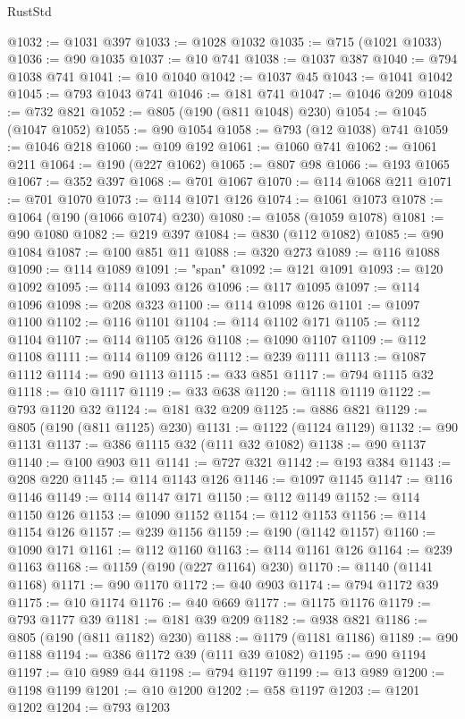 \begin{lexlean}{RustStd}
\begin{coremodule}
@1032 := @1031 @397
@1033 := @1028 @1032
@1035 := @715 (@1021 @1033)
@1036 := @90 @1035
@1037 := @10 @741
@1038 := @1037 @387
@1040 := @794 @1038 @741
@1041 := @10 @1040
@1042 := @1037 @45
@1043 := @1041 @1042
@1045 := @793 @1043 @741
@1046 := @181 @741
@1047 := @1046 @209
@1048 := @732 @821
@1052 := @805 (@190 (@811 @1048) @230)
@1054 := @1045 (@1047 @1052)
@1055 := @90 @1054
@1058 := @793 (@12 @1038) @741
@1059 := @1046 @218
@1060 := @109 @192
@1061 := @1060 @741
@1062 := @1061 @211
@1064 := @190 (@227 @1062)
@1065 := @807 @98
@1066 := @193 @1065
@1067 := @352 @397
@1068 := @701 @1067
@1070 := @114 @1068 @211
@1071 := @701 @1070
@1073 := @114 @1071 @126
@1074 := @1061 @1073
@1078 := @1064 (@190 (@1066 @1074) @230)
@1080 := @1058 (@1059 @1078)
@1081 := @90 @1080
@1082 := @219 @397
@1084 := @830 (@112 @1082)
@1085 := @90 @1084
@1087 := @100 @851 @11
@1088 := @320 @273
@1089 := @116 @1088
@1090 := @114 @1089
@1091 := "span"
@1092 := @121 @1091
@1093 := @120 @1092
@1095 := @114 @1093 @126
@1096 := @117 @1095
@1097 := @114 @1096
@1098 := @208 @323
@1100 := @114 @1098 @126
@1101 := @1097 @1100
@1102 := @116 @1101
@1104 := @114 @1102 @171
@1105 := @112 @1104
@1107 := @114 @1105 @126
@1108 := @1090 @1107
@1109 := @112 @1108
@1111 := @114 @1109 @126
@1112 := @239 @1111
@1113 := @1087 @1112
@1114 := @90 @1113
@1115 := @33 @851
@1117 := @794 @1115 @32
@1118 := @10 @1117
@1119 := @33 @638
@1120 := @1118 @1119
@1122 := @793 @1120 @32
@1124 := @181 @32 @209
@1125 := @886 @821
@1129 := @805 (@190 (@811 @1125) @230)
@1131 := @1122 (@1124 @1129)
@1132 := @90 @1131
@1137 := @386 @1115 @32 (@111 @32 @1082)
@1138 := @90 @1137
@1140 := @100 @903 @11
@1141 := @727 @321
@1142 := @193 @384
@1143 := @208 @220
@1145 := @114 @1143 @126
@1146 := @1097 @1145
@1147 := @116 @1146
@1149 := @114 @1147 @171
@1150 := @112 @1149
@1152 := @114 @1150 @126
@1153 := @1090 @1152
@1154 := @112 @1153
@1156 := @114 @1154 @126
@1157 := @239 @1156
@1159 := @190 (@1142 @1157)
@1160 := @1090 @171
@1161 := @112 @1160
@1163 := @114 @1161 @126
@1164 := @239 @1163
@1168 := @1159 (@190 (@227 @1164) @230)
@1170 := @1140 (@1141 @1168)
@1171 := @90 @1170
@1172 := @40 @903
@1174 := @794 @1172 @39
@1175 := @10 @1174
@1176 := @40 @669
@1177 := @1175 @1176
@1179 := @793 @1177 @39
@1181 := @181 @39 @209
@1182 := @938 @821
@1186 := @805 (@190 (@811 @1182) @230)
@1188 := @1179 (@1181 @1186)
@1189 := @90 @1188
@1194 := @386 @1172 @39 (@111 @39 @1082)
@1195 := @90 @1194
@1197 := @10 @989 @44
@1198 := @794 @1197
@1199 := @13 @989
@1200 := @1198 @1199
@1201 := @10 @1200
@1202 := @58 @1197
@1203 := @1201 @1202
@1204 := @793 @1203

\end{coremodule}
\end{lexlean}
